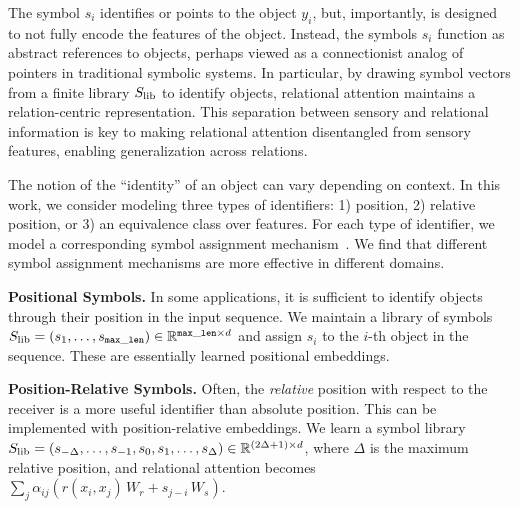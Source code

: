 The symbol $s_i$ identifies or points to the object $y_i$, but, importantly, is designed to not fully encode the features of the object.
Instead, the symbols $s_i$ function as abstract references to objects, perhaps viewed as a connectionist analog of pointers in traditional symbolic systems.
In particular, by drawing symbol vectors from a finite library $S_\mathrm{lib}$ to identify objects, relational attention maintains a relation-centric representation.
This separation between sensory and relational information is key to making relational attention disentangled from sensory features, enabling generalization across relations.

The notion of the ``identity'' of an object can vary depending on context. In this work, we consider modeling three types of identifiers: 1) position, 2) relative position, or 3) an equivalence class over features. For each type of identifier, we model a corresponding symbol assignment mechanism~\citep{altabaa2024abstractors}. We find that different symbol assignment mechanisms are more effective in different domains.

\textbf{Positional Symbols.} In some applications, it is sufficient to identify objects through their position in the input sequence. We maintain a library of symbols $S_\mathrm{lib} = (s_1, \ldots, s_{\mathtt{max\_len}}) \in \mathbb{R}^{\mathtt{max\_len} \times d}$ and assign $s_i$ to the $i$-th object in the sequence. These are essentially learned positional embeddings.

\textbf{Position-Relative Symbols.} Often, the \textit{relative} position with respect to the receiver is a more useful identifier than absolute position. This can be implemented with position-relative embeddings. We learn a symbol library $S_\mathrm{lib} = (s_{-\Delta}, \ldots, s_{-1}, s_0, s_1, \ldots, s_{\Delta}) \in \mathbb{R}^{(2 \Delta + 1) \times d}$, where $\Delta$ is the maximum relative position, and relational attention becomes $\sum_{j} \alpha_{ij}  (r(x_i, x_j) \, W_r + s_{j-i} \,  W_s)$.%

